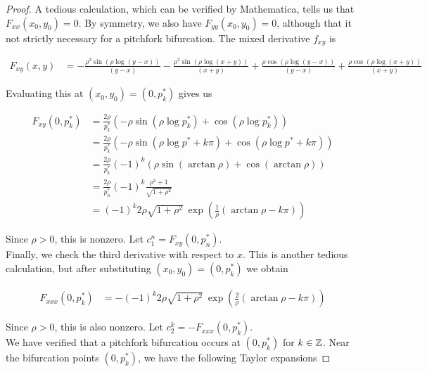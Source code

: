 \documentclass[thesis.tex]{subfiles}
\begin{document}
\begin{lemma}
\begin{proof}
A tedious calculation, which can be verified by Mathematica, tells us that $F_{xx}(x_0, y_0) = 0$. By symmetry, we also have $F_{yy}(x_0, y_0) = 0$, although that it not strictly necessary for a pitchfork bifurcation. The mixed derivative $f_{xy}$ is

\begin{align*}
F_{xy}(x, y) &= -\frac{\rho^2 \sin \left(\rho \log (y-x)\right)}{(y-x)}-\frac{\rho^2 \sin
   \left(\rho \log (x+y)\right)}{(x+y)}+\frac{\rho \cos \left(\rho \log (y-x)\right)}{(y-x)}+\frac{\rho \cos \left( \rho \log (x+y) \right)}{(x+y)}
\end{align*}

Evaluating this at $(x_0, y_0) = \left(0, p^*_k \right)$ gives us

\begin{align*}
F_{xy}(0, p^*_k) &= \frac{2 \rho}{p^*_k}\left( -\rho \sin \left(\rho \log p^*_k \right) + \cos \left(\rho \log p^*_k \right) \right)\\
&= \frac{2 \rho}{p^*_k}\left( -\rho \sin \left(\rho \log p^* + k \pi \right) + \cos \left(\rho \log p^* + k \pi \right) \right) \\
&= \frac{2 \rho}{p^*_k} (-1)^k \left( \rho \sin \left(\arctan \rho \right) + \cos \left(\arctan \rho \right) \right)\\ 
&= \frac{2 \rho}{p_n^*} (-1)^k \frac{\rho^2 + 1}{\sqrt{1 + \rho^2}} \\
&= (-1)^k 2 \rho \sqrt{1 + \rho^2} \: \exp{\left(\frac{1}{\rho} (\arctan \rho - k \pi) \right)}
\end{align*}

Since $\rho > 0$, this is nonzero. Let $c_1^n = F_{xy}(0, p^*_n)$. \\

Finally, we check the third derivative with respect to $x$. This is another tedious calculation, but after substituting $(x_0, y_0) = \left(0, p^*_k \right)$ we obtain

\begin{align*}
F_{xxx}(0, p_k^*)
&= -(-1)^k 2 \rho \sqrt{1 + \rho^2} \: \exp{\left(\frac{2}{\rho} (\arctan \rho - k \pi) \right)}
\end{align*}

Since $\rho > 0$, this is also nonzero. Let $c_2^k = -F_{xxx}(0, p^*_k)$. \\

We have verified that a pitchfork bifurcation occurs at $(0, p^*_k)$ for $k \in {\mathbb Z}$. Near the bifurcation points $(0, p_k^*)$, we have the following Taylor expansions


\end{proof}
\end{lemma}
\end{document}
